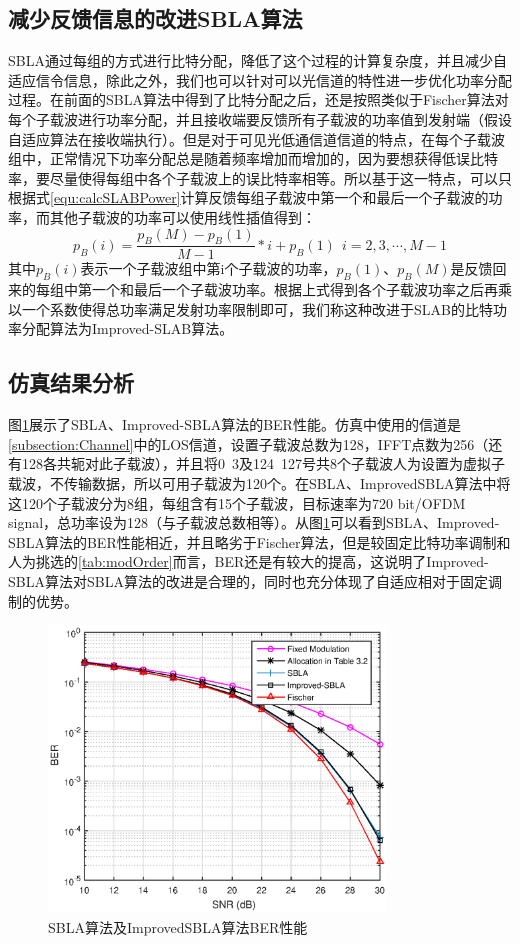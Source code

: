 \subsection{减少反馈信息的改进SBLA算法}
SBLA通过每组的方式进行比特分配，降低了这个过程的计算复杂度，并且减少自适应信令信息，除此之外，我们也可以针对可以光信道的特性进一步优化功率分配过程。在前面的SBLA算法中得到了比特分配之后，还是按照类似于Fischer算法对每个子载波进行功率分配，并且接收端要反馈所有子载波的功率值到发射端（假设自适应算法在接收端执行）。但是对于可见光低通信道信道的特点，在每个子载波组中，正常情况下功率分配总是随着频率增加而增加的，因为要想获得低误比特率，要尽量使得每组中各个子载波上的误比特率相等。所以基于这一特点，可以只根据式\ref{equ:calcSLABPower}计算反馈每组子载波中第一个和最后一个子载波的功率，而其他子载波的功率可以使用线性插值得到：
\begin{equation}
p_B(i) = \frac{p_B(M)-p_B(1)}{M-1}*i+p_B(1)\ \ i=2,3,\cdots,M-1
\end{equation}
其中$p_B(i)$表示一个子载波组中第i个子载波的功率，$p_B(1)$、$p_B(M)$是反馈回来的每组中第一个和最后一个子载波功率。根据上式得到各个子载波功率之后再乘以一个系数使得总功率满足发射功率限制即可，我们称这种改进于SLAB的比特功率分配算法为Improved-SLAB算法。

\subsection{仿真结果分析}
图\ref{fig:SBLABERonDiffAlgo}展示了SBLA、Improved-SBLA算法的BER性能。仿真中使用的信道是\ref{subsection:Channel}中的LOS信道，设置子载波总数为128，IFFT点数为256（还有128各共轭对此子载波），并且将0~3及124~127号共8个子载波人为设置为虚拟子载波，不传输数据，所以可用子载波为120个。在SBLA、ImprovedSBLA算法中将这120个子载波分为8组，每组含有15个子载波，目标速率为720 bit/OFDM signal，总功率设为128（与子载波总数相等）。从图\ref{fig:SBLABERonDiffAlgo}可以看到SBLA、Improved-SBLA算法的BER性能相近，并且略劣于Fischer算法，但是较固定比特功率调制和人为挑选的\ref{tab:modOrder}而言，BER还是有较大的提高，这说明了Improved-SBLA算法对SBLA算法的改进是合理的，同时也充分体现了自适应相对于固定调制的优势。
\begin{figure}[htbp]
\centering
\includegraphics[width=0.8\textwidth]{figures/chapter-4/SBLABERonDiffAlgo.eps}
\caption{SBLA算法及ImprovedSBLA算法BER性能}
\label{fig:SBLABERonDiffAlgo}
\end{figure}

